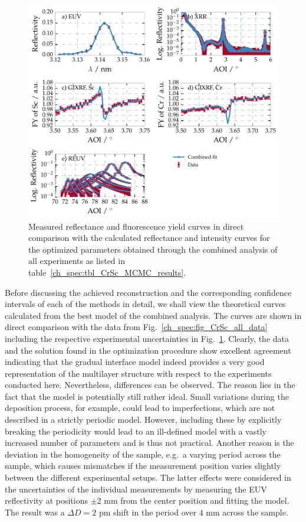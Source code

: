 \begin{figure}[htbp]
  \centering
  \includegraphics[width=\textwidth]{img/CrSc_combined_fit_result}
  \caption[Measured data and optimized theoretical curves for all measurements in the combined analysis of the Cr/Sc system.]{Measured reflectance and fluorescence yield curves in direct comparison with the calculated reflectance and intensity curves for the 
optimized parameters obtained through the combined analysis of all experiments as listed in 
table~\ref{ch_spec:tbl_CrSc_MCMC_results}.}
  \label{ch_spec:fig_combined_fit_result}
\end{figure}
Before discussing the achieved reconstruction and the corresponding confidence intervals of each of the methods in detail, we shall view the theoretical curves calculated from the best model of the combined analysis. The curves are shown in direct comparison with the data from Fig.~\ref{ch_spec:fig_CrSc_all_data} including the respective experimental uncertainties in Fig.~\ref{ch_spec:fig_combined_fit_result}. Clearly, the data and the solution found in the optimization procedure show excellent agreement indicating that the gradual interface model indeed provides a very good representation of the multilayer structure with respect to the experiments conducted here. Nevertheless, differences can be observed. The reason lies 
in the fact that the model is potentially still rather ideal. Small variations 
during the deposition process, for example, could lead to imperfections, which 
are not described in a strictly periodic model. However, including these by 
explicitly breaking the periodicity would lead to an ill-defined model 
with a vastly increased number of parameters and is thus not practical. Another 
reason is the deviation in the homogeneity of the sample, e.g.~a varying period 
across the sample, which causes mismatches if the measurement position varies 
slightly between the different experimental setups. The latter effects were 
considered in the uncertainties of the individual measurements by measuring the 
EUV reflectivity at positions $\pm 2$ mm from the center position and fitting 
the model. The result was a $\Delta D = 2$ pm shift in the period over $4$ mm 
across the sample.


